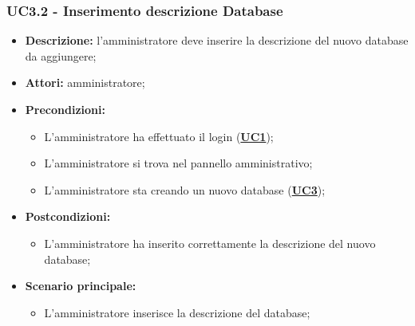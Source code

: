 \subsubsection{UC3.2 - Inserimento descrizione Database}
\label{sec:UC3.2}
\begin{itemize}
	\item \textbf{Descrizione:} l’amministratore deve inserire la descrizione del nuovo database da aggiungere;
	\item \textbf{Attori:} amministratore;
	\item \textbf{Precondizioni:} 
	\begin{itemize}
		\item L’amministratore ha effettuato il login (\hyperref[sec:UC1]{\textbf{UC1}});
		\item L’amministratore si trova nel pannello amministrativo;
		\item L’amministratore sta creando un nuovo database (\hyperref[sec:UC3]{\textbf{UC3}});
	\end{itemize}
	\item \textbf{Postcondizioni:} 
	\begin{itemize}
		\item L'amministratore ha inserito correttamente la descrizione del nuovo database;
	\end{itemize}
	\item \textbf{Scenario principale:} 
	\begin{itemize}
		\item L’amministratore inserisce la descrizione del database;
	\end{itemize}
\end{itemize}

